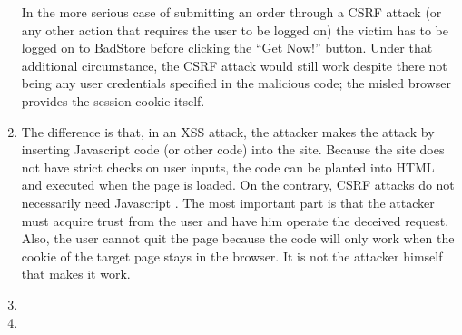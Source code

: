 \begin{enumerate}
In the more serious case of submitting an order through a CSRF attack (or any other action that requires the user to be logged on) the victim has to be logged on to BadStore before clicking the ``Get Now!'' button. Under that additional circumstance, the CSRF attack would still work despite there not being any user credentials specified in the malicious code; the misled browser provides the session cookie itself.
\item The difference is that, in an XSS attack, the attacker makes the attack by inserting Javascript code (or other code) into the site. Because the site does not have strict checks on user inputs, the code can be planted into HTML and executed when the page is loaded. On the contrary, CSRF attacks do not necessarily need Javascript \cite{website:wikipedia_CSRF_XSS}. The most important part is that the attacker must acquire trust from the user and have him operate the deceived request. Also, the user cannot quit the page because the code will only work when the cookie of the target page stays in the browser. It is not the attacker himself that makes it work.
\item \highergradesonly
\item \highergradesonly
\end{enumerate}
